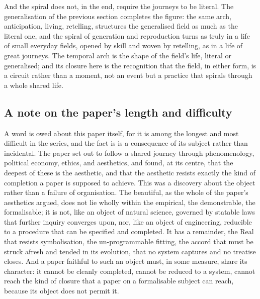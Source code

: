 And the spiral does not, in the end, require the journeys to be literal. The generalisation of the previous section completes the figure: the same arch, anticipation, living, retelling, structures the generalised field as much as the literal one, and the spiral of generation and reproduction turns as truly in a life of small everyday fields, opened by skill and woven by retelling, as in a life of great journeys. The temporal arch is the shape of the field's life, literal or generalised; and its closure here is the recognition that the field, in either form, is a circuit rather than a moment, not an event but a practice that spirals through a whole shared life.

\subsection{A note on the paper's length and difficulty}
\label{p21:sub:clo-difficulty}

A word is owed about this paper itself, for it is among the longest and most difficult in the series, and the fact is is a consequence of its subject rather than incidental. The paper set out to follow a shared journey through phenomenology, political economy, ethics, and aesthetics, and found, at its centre, that the deepest of these is the aesthetic, and that the aesthetic resists exactly the kind of completion a paper is supposed to achieve. This was a discovery about the object rather than a failure of organisation. The beautiful, as the whole of the paper's aesthetics argued, does not lie wholly within the empirical, the demonstrable, the formalisable; it is not, like an object of natural science, governed by statable laws that further inquiry converges upon, nor, like an object of engineering, reducible to a procedure that can be specified and completed. It has a remainder, the Real that resists symbolisation, the un-programmable fitting, the accord that must be struck afresh and tended in its evolution, that no system captures and no treatise closes. And a paper faithful to such an object must, in some measure, share its character: it cannot be cleanly completed, cannot be reduced to a system, cannot reach the kind of closure that a paper on a formalisable subject can reach, because its object does not permit it.

